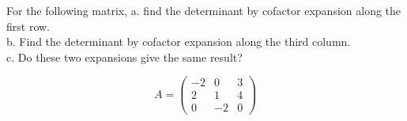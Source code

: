\documentclass{ximera}
\author{Parisa Fatheddin}
\begin{document}
\begin{exercise}

For the following matrix,
a. find the determinant by cofactor expansion along the first row. \\
b. Find the determinant by cofactor expansion along the third column.\\
c. Do these two expansions give the same result? 

\[A = \begin{pmatrix}
-2 & 0 & 3\\
2 & 1 & 4 \\
0 & -2 & 0 
\end{pmatrix}
\]



















\end{exercise}
\end{document}
